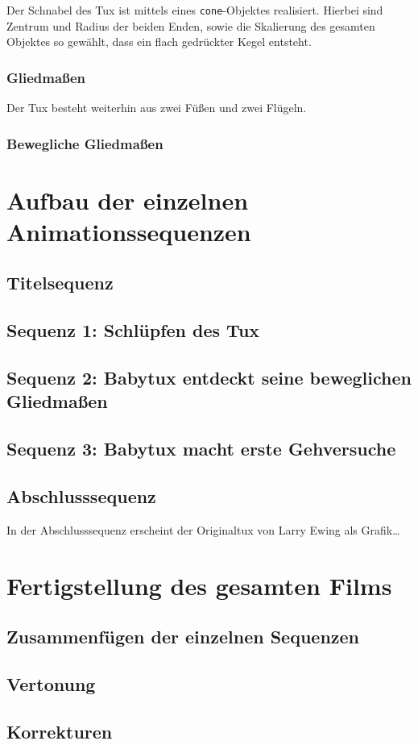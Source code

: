 \documentclass[11pt,parskip]{scrartcl}
\begin{document}
Der Schnabel des Tux ist mittels eines \texttt{cone}-Objektes realisiert.
Hierbei sind Zentrum und Radius der beiden Enden, sowie die Skalierung des
gesamten Objektes so gewählt, dass ein flach gedrückter Kegel entsteht.

\subsubsection{Gliedmaßen}
Der Tux besteht weiterhin aus zwei Füßen und zwei Flügeln.


\subsubsection{Bewegliche Gliedmaßen}


\newpage

\section{Aufbau der einzelnen Animationssequenzen}


\subsection{Titelsequenz}


\subsection{Sequenz 1: Schlüpfen des Tux}


\subsection{Sequenz 2: Babytux entdeckt seine beweglichen Gliedmaßen}


\subsection{Sequenz 3: Babytux macht erste Gehversuche}


\subsection{Abschlusssequenz}
In der Abschlusssequenz erscheint der Originaltux von Larry Ewing als
Grafik\ldots


\newpage

\section{Fertigstellung des gesamten Films}


\subsection{Zusammenfügen der einzelnen Sequenzen}


\subsection{Vertonung}


\subsection{Korrekturen}


\newpage
{}


\end{document}
